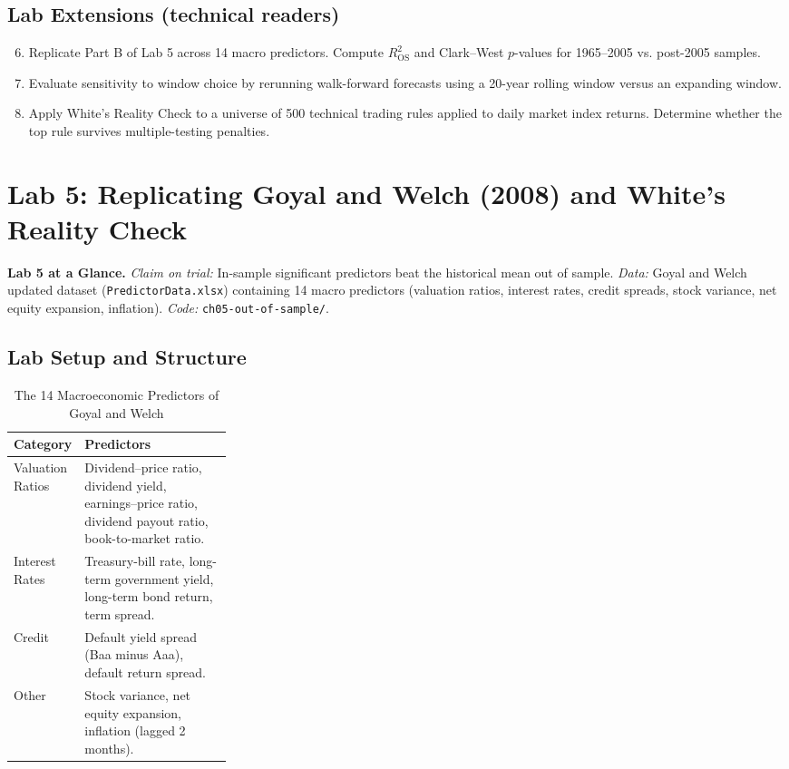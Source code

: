\subsection*{Lab Extensions (technical readers)}
\begin{enumerate}
  \setcounter{enumi}{5}
  \item Replicate Part B of Lab 5 across 14 macro predictors. Compute $R^2_{\text{OS}}$ and Clark--West $p$-values for 1965--2005 vs. post-2005 samples.
  \item Evaluate sensitivity to window choice by rerunning walk-forward forecasts using a 20-year rolling window versus an expanding window.
  \item Apply White's Reality Check to a universe of 500 technical trading rules applied to daily market index returns. Determine whether the top rule survives multiple-testing penalties.
\end{enumerate}

\section{Lab 5: Replicating Goyal and Welch (2008) and White's Reality Check}
\label{sec:05-lab}

\begin{callout}
\noindent \textbf{Lab 5 at a Glance.} \emph{Claim on trial:} In-sample significant predictors beat the historical mean out of sample. \emph{Data:} Goyal and Welch updated dataset (\texttt{PredictorData.xlsx}) containing 14 macro predictors (valuation ratios, interest rates, credit spreads, stock variance, net equity expansion, inflation). \emph{Code:} \texttt{ch05-out-of-sample/}.
\end{callout}

\subsection*{Lab Setup and Structure}
\begin{table}[htbp]
\centering
\small
\caption{The 14 Macroeconomic Predictors of Goyal and Welch}
\label{tab:05-goyal-predictors}
\begin{tabularx}{0.95\linewidth}{@{}>{\raggedright\arraybackslash}p{0.28\linewidth}>{\raggedright\arraybackslash}X@{}}
\toprule
Category & Predictors \\
\midrule
Valuation Ratios & Dividend--price ratio, dividend yield, earnings--price ratio, dividend payout ratio, book-to-market ratio. \\
Interest Rates & Treasury-bill rate, long-term government yield, long-term bond return, term spread. \\
Credit & Default yield spread (Baa minus Aaa), default return spread. \\
Other & Stock variance, net equity expansion, inflation (lagged 2 months). \\
\bottomrule
\end{tabularx}
\end{table}

